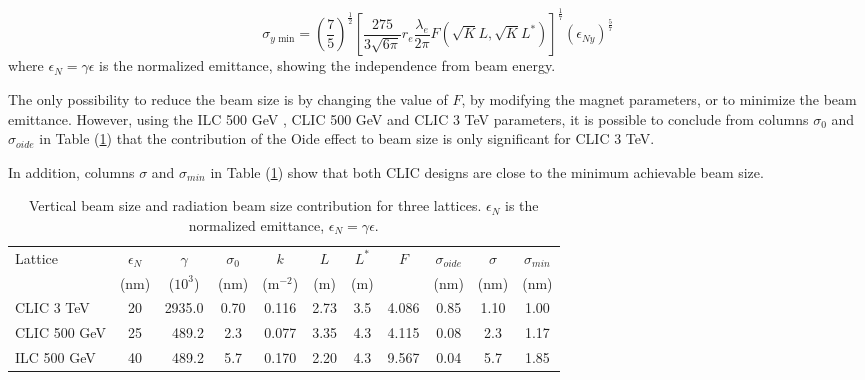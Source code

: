 \begin{equation}
 \sigma_{y \text{ min}} = \left(\frac{7}{5}\right)^\frac{1}{2}\left[\frac{275}{3\sqrt{6\pi}}r_e\frac{\lambda_e}{2\pi}F(\sqrt{K}L,\sqrt{K}L^*)\right]^\frac{1}{7}(\epsilon_{Ny})^\frac{5}{7}
\end{equation}
where $\epsilon_N=\gamma\epsilon$ is the normalized emittance, showing the independence from beam energy.\par
The only possibility to reduce the beam size is by changing the value of $F$, by modifying the magnet parameters, or to minimize the beam emittance. However, using the ILC 500 GeV \cite{ILCdes}, CLIC 500 GeV and CLIC 3 TeV \cite{CLICdes} parameters, it is possible to conclude from columns $\sigma_0$ and $\sigma_{oide}$ in Table (\ref{t:Sigmas}) that the contribution of the Oide effect to beam size is only significant for CLIC 3 TeV.\par
In addition, columns $\sigma$ and $\sigma_{min}$ in Table (\ref{t:Sigmas}) show that both CLIC designs are close to the minimum achievable beam size.\par
\begin{table}[!hbt]
\centering
{\scriptsize
\begin{tabular}{l||c|c|c||c|c|c|c|c||c|c}\hline\hline
Lattice &$\epsilon_N$& $\gamma$& $\sigma_0$&$k$&$L$&$L^*$& $F$ & $\sigma_{oide}$&$\sigma$&$\sigma_{min}$\\
 &(nm)&($10^3$)&(nm)&(m$^{-2}$)&(m)&(m)&&(nm) &(nm)&(nm)\\\hline
CLIC 3 TeV & 20 & 2935.0 & 0.70 & 0.116 & 2.73 &3.5&  4.086  & 0.85 & 1.10& 1.00 \\
CLIC 500 GeV & 25 & $\;\;$489.2 & 2.3 & 0.077 & 3.35 &4.3& 4.115 & 0.08 & 2.3 & 1.17\\
ILC  500 GeV & 40 & $\;\;$489.2 & 5.7 & 0.170 & 2.20 &4.3& 9.567 & 0.04 & 5.7 & 1.85\\\hline
\end{tabular}\caption{Vertical beam size and radiation beam size contribution for three lattices. $\epsilon_N$ is the normalized emittance, $\epsilon_N=\gamma\epsilon$.}\label{t:Sigmas}
}
\end{table}

